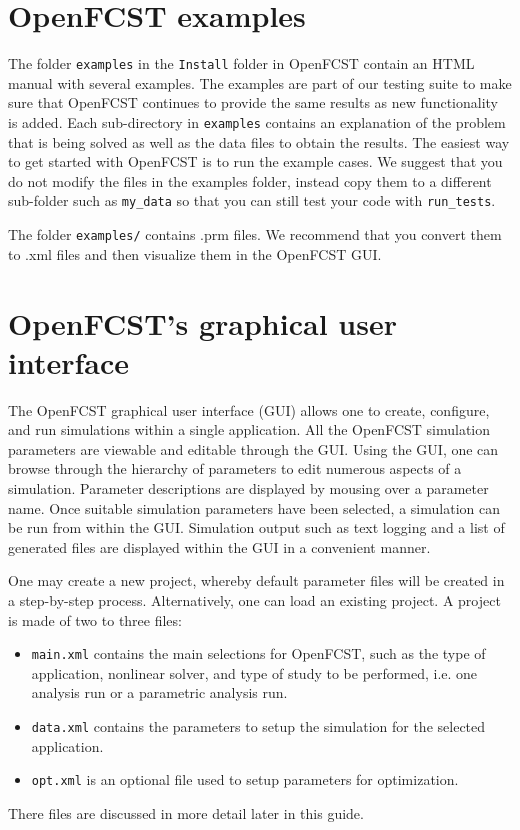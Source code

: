 \section{OpenFCST examples}

The folder \texttt{examples} in the \texttt{Install} folder in OpenFCST contain an HTML manual with several examples. The examples are part of our testing suite to make sure that OpenFCST continues to provide the same results as new functionality is added. Each sub-directory in \texttt{examples} contains an explanation of the problem that is being solved as well as the data files to obtain the results. The easiest way to get started with OpenFCST is to run the example cases. We suggest that you do not modify the files in the examples folder, instead copy them to a different sub-folder such as \texttt{my\_data} so that you can still test your code with \texttt{run\_tests}.

The folder \texttt{examples/} contains .prm files. We recommend that you convert them to .xml files and then visualize them in the OpenFCST GUI. 

\section{OpenFCST's graphical user interface}

The OpenFCST graphical user interface (GUI) allows one to create, configure, and run simulations within a single application. All the OpenFCST simulation parameters are viewable and editable through the GUI. Using the GUI, one can browse through the hierarchy of parameters to edit numerous aspects of a simulation. Parameter descriptions are displayed by mousing over a parameter name. Once suitable simulation parameters have been selected, a simulation can be run from within the GUI. Simulation output such as text logging and a list of generated files are displayed within the GUI in a convenient manner.

One may create a new project, whereby default parameter files will be created in a step-by-step process. Alternatively, one can load an existing project. A project is made of two to three files:
\begin{itemize}
 \item \texttt{main.xml} contains the main selections for OpenFCST, such as the type of application, nonlinear solver, and type of study to be performed, i.e. one analysis run or a parametric analysis run.
 \item \texttt{data.xml} contains the parameters to setup the simulation for the selected application.
 \item \texttt{opt.xml} is an optional file used to setup parameters for optimization.
\end{itemize}
There files are discussed in more detail later in this guide.

